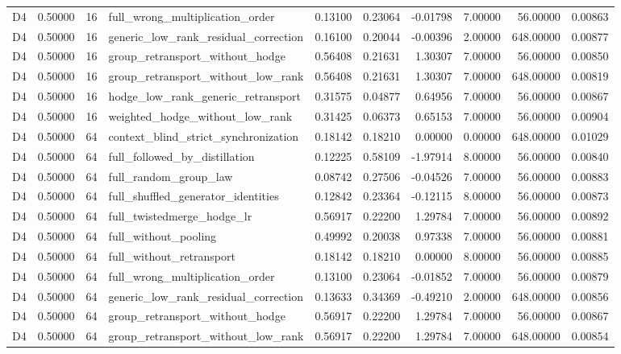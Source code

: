 \begin{tabular}{lrrlrrrrrr}
D4 & 0.50000 & 16 & full_wrong_multiplication_order & 0.13100 & 0.23064 & -0.01798 & 7.00000 & 56.00000 & 0.00863 \\
D4 & 0.50000 & 16 & generic_low_rank_residual_correction & 0.16100 & 0.20044 & -0.00396 & 2.00000 & 648.00000 & 0.00877 \\
D4 & 0.50000 & 16 & group_retransport_without_hodge & 0.56408 & 0.21631 & 1.30307 & 7.00000 & 56.00000 & 0.00850 \\
D4 & 0.50000 & 16 & group_retransport_without_low_rank & 0.56408 & 0.21631 & 1.30307 & 7.00000 & 648.00000 & 0.00819 \\
D4 & 0.50000 & 16 & hodge_low_rank_generic_retransport & 0.31575 & 0.04877 & 0.64956 & 7.00000 & 56.00000 & 0.00867 \\
D4 & 0.50000 & 16 & weighted_hodge_without_low_rank & 0.31425 & 0.06373 & 0.65153 & 7.00000 & 56.00000 & 0.00904 \\
D4 & 0.50000 & 64 & context_blind_strict_synchronization & 0.18142 & 0.18210 & 0.00000 & 0.00000 & 648.00000 & 0.01029 \\
D4 & 0.50000 & 64 & full_followed_by_distillation & 0.12225 & 0.58109 & -1.97914 & 8.00000 & 56.00000 & 0.00840 \\
D4 & 0.50000 & 64 & full_random_group_law & 0.08742 & 0.27506 & -0.04526 & 7.00000 & 56.00000 & 0.00883 \\
D4 & 0.50000 & 64 & full_shuffled_generator_identities & 0.12842 & 0.23364 & -0.12115 & 8.00000 & 56.00000 & 0.00873 \\
D4 & 0.50000 & 64 & full_twistedmerge_hodge_lr & 0.56917 & 0.22200 & 1.29784 & 7.00000 & 56.00000 & 0.00892 \\
D4 & 0.50000 & 64 & full_without_pooling & 0.49992 & 0.20038 & 0.97338 & 7.00000 & 56.00000 & 0.00881 \\
D4 & 0.50000 & 64 & full_without_retransport & 0.18142 & 0.18210 & 0.00000 & 8.00000 & 56.00000 & 0.00885 \\
D4 & 0.50000 & 64 & full_wrong_multiplication_order & 0.13100 & 0.23064 & -0.01852 & 7.00000 & 56.00000 & 0.00879 \\
D4 & 0.50000 & 64 & generic_low_rank_residual_correction & 0.13633 & 0.34369 & -0.49210 & 2.00000 & 648.00000 & 0.00856 \\
D4 & 0.50000 & 64 & group_retransport_without_hodge & 0.56917 & 0.22200 & 1.29784 & 7.00000 & 56.00000 & 0.00867 \\
D4 & 0.50000 & 64 & group_retransport_without_low_rank & 0.56917 & 0.22200 & 1.29784 & 7.00000 & 648.00000 & 0.00854 \\

\end{tabular}
